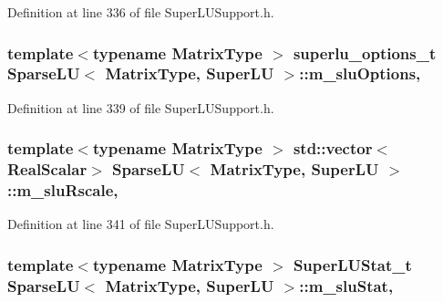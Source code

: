 Definition at line 336 of file Super\-L\-U\-Support.\-h.

\hypertarget{class_sparse_l_u_3_01_matrix_type_00_01_super_l_u_01_4_a7a682af53524b683030b75b341ef8b3d}{
\subsubsection[{m\-\_\-slu\-Options}]{\setlength{\rightskip}{0pt plus 5cm}template$<$typename Matrix\-Type $>$ superlu\-\_\-options\-\_\-t {\bf Sparse\-L\-U}$<$ Matrix\-Type, {\bf Super\-L\-U} $>$\-::m\-\_\-slu\-Options\hspace{0.3cm}{\ttfamily [mutable]}, {\ttfamily [protected]}}}\label{class_sparse_l_u_3_01_matrix_type_00_01_super_l_u_01_4_a7a682af53524b683030b75b341ef8b3d}


Definition at line 339 of file Super\-L\-U\-Support.\-h.

\hypertarget{class_sparse_l_u_3_01_matrix_type_00_01_super_l_u_01_4_a063708bbf4aedffb3e56440f13f36c41}{
\subsubsection[{m\-\_\-slu\-Rscale}]{\setlength{\rightskip}{0pt plus 5cm}template$<$typename Matrix\-Type $>$ std\-::vector$<${\bf Real\-Scalar}$>$ {\bf Sparse\-L\-U}$<$ Matrix\-Type, {\bf Super\-L\-U} $>$\-::m\-\_\-slu\-Rscale\hspace{0.3cm}{\ttfamily [mutable]}, {\ttfamily [protected]}}}\label{class_sparse_l_u_3_01_matrix_type_00_01_super_l_u_01_4_a063708bbf4aedffb3e56440f13f36c41}


Definition at line 341 of file Super\-L\-U\-Support.\-h.

\hypertarget{class_sparse_l_u_3_01_matrix_type_00_01_super_l_u_01_4_a3000e29ed20a97d861ed9ebb16a72cc6}{
\subsubsection[{m\-\_\-slu\-Stat}]{\setlength{\rightskip}{0pt plus 5cm}template$<$typename Matrix\-Type $>$ Super\-L\-U\-Stat\-\_\-t {\bf Sparse\-L\-U}$<$ Matrix\-Type, {\bf Super\-L\-U} $>$\-::m\-\_\-slu\-Stat\hspace{0.3cm}{\ttfamily [mutable]}, {\ttfamily [protected]}}}\label{class_sparse_l_u_3_01_matrix_type_00_01_super_l_u_01_4_a3000e29ed20a97d861ed9ebb16a72cc6}


